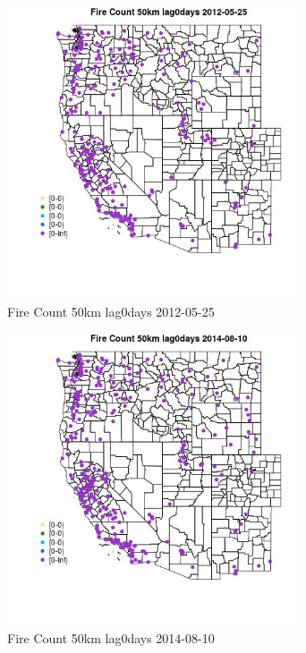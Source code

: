 \begin{figure} 
\centering  
\includegraphics[width=0.77\textwidth]{Code_Outputs/Report_ML_input_PM25_Step4_part_e_de_duplicated_aves_compiled_2019-05-18wNAs_MapObsFire_Count_50km_lag0days2012-05-25.jpg} 
\caption{\label{fig:Report_ML_input_PM25_Step4_part_e_de_duplicated_aves_compiled_2019-05-18wNAsMapObsFire_Count_50km_lag0days2012-05-25}Fire Count 50km lag0days 2012-05-25} 
\end{figure} 
 

\begin{figure} 
\centering  
\includegraphics[width=0.77\textwidth]{Code_Outputs/Report_ML_input_PM25_Step4_part_e_de_duplicated_aves_compiled_2019-05-18wNAs_MapObsFire_Count_50km_lag0days2014-08-10.jpg} 
\caption{\label{fig:Report_ML_input_PM25_Step4_part_e_de_duplicated_aves_compiled_2019-05-18wNAsMapObsFire_Count_50km_lag0days2014-08-10}Fire Count 50km lag0days 2014-08-10} 
\end{figure} 
 

